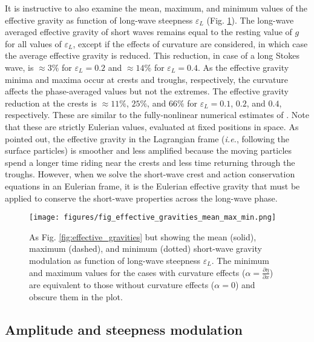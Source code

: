 \documentclass[lineno]{jfm}
\begin{document}
It is instructive to also examine the mean, maximum, and minimum values of the
effective gravity as function of long-wave steepness $\varepsilon_L$
(Fig. \ref{fig:effective_gravities_mean_max_min}).
The long-wave averaged effective gravity of short waves remains equal to the
resting value of $g$ for all values of $\varepsilon_L$, except if the effects
of curvature are considered, in which case the average effective gravity is
reduced.
This reduction, in case of a long Stokes wave, is $\approx 3\%$ for
$\varepsilon_L = 0.2$ and $\approx 14\%$ for $\varepsilon_L = 0.4$.
As the effective gravity minima and maxima occur at crests and troughs,
respectively, the curvature affects the phase-averaged values but not the extremes.
The effective gravity reduction at the crests is $\approx 11\%$, $25\%$, and $66\%$
for $\varepsilon_L = 0.1$, $0.2$, and $0.4$, respectively.
These are similar to the fully-nonlinear numerical estimates of
\citet{longuet1986eulerian,longuet1987propagation}.
Note that these are strictly Eulerian values, evaluated at fixed positions in
space.
As \citet{longuet1986eulerian} pointed out, the effective gravity in the
Lagrangian frame (\textit{i.e.}, following the surface particles) is smoother
and less amplified because the moving particles spend a longer time riding near
the crests and less time returning through the troughs.
However, when we solve the short-wave crest and action conservation equations
in an Eulerian frame, it is the Eulerian effective gravity that must be applied
to conserve the short-wave properties across the long-wave phase.

\begin{figure}
\centering
\texttt{[image: figures/fig\_effective\_gravities\_mean\_max\_min.png]}
\caption{
  As Fig. \ref{fig:effective_gravities} but showing the mean (solid),
  maximum (dashed), and minimum (dotted) short-wave gravity modulation as
  function of long-wave steepness $\varepsilon_L$.
  The minimum and maximum values for the cases with curvature effects
  ($\alpha=\frac{\partial \eta}{\partial x}$) are equivalent to those without
  curvature effects ($\alpha=0$) and obscure them in the plot.
}
\label{fig:effective_gravities_mean_max_min}
\end{figure}

\subsection{Amplitude and steepness modulation}
\label{subsection:amplitude_modulation}
\end{document}
